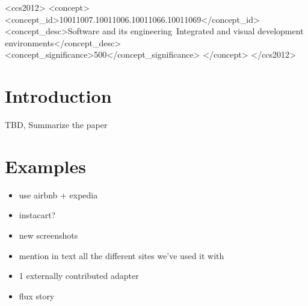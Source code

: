 \documentclass[sigplan,10pt,anonymous,review]{acmart}
\providecommand{\tightlist}{%
  \setlength{\itemsep}{0pt}\setlength{\parskip}{0pt}}
\begin{document}
\begin{CCSXML}
<ccs2012>
<concept>
<concept_id>10011007.10011006.10011066.10011069</concept_id>
<concept_desc>Software and its engineering~Integrated and visual development environments</concept_desc>
<concept_significance>500</concept_significance>
</concept>
</ccs2012>
\end{CCSXML}




\maketitle

\hypertarget{introduction}{%
\section{Introduction}\label{introduction}}

TBD, Summarize the paper

\hypertarget{examples}{%
\section{Examples}\label{examples}}

\begin{itemize}
\tightlist
\item
  use airbnb + expedia
\item
  instacart?
\item
  new screenshots
\item
  mention in text all the different sites we've used it with
\item
  1 externally contributed adapter
\item
  flux story
\end{itemize}
\end{document}
